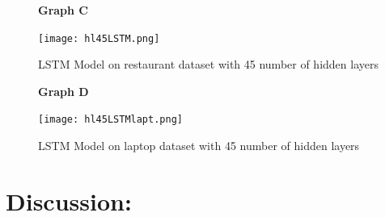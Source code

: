 \documentclass[comsoc,conference]{IEEEtran}
\begin{document}
\begin{figure}[hp]
\centerin
\textbf{Graph C} \par \medskip 
\caption{LSTM Model on restaurant dataset with 45 number of hidden layers}
\texttt{[image: hl45LSTM.png]}
\end{figure}




\newpage
\begin{figure}[hp]
\centerin
\textbf{Graph D} \par \medskip 
\caption{LSTM Model on laptop dataset with 45 number of hidden layers}
\texttt{[image: hl45LSTMlapt.png]}
\end{figure}

\newpage
\section{Discussion:}
\end{document}
